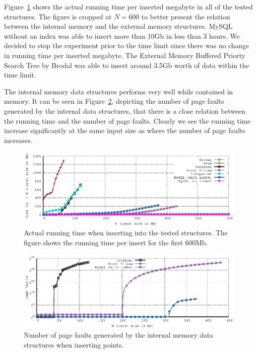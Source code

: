 \documentclass[twoside,11pt,openright]{report}
\begin{document}
Figure~\ref{fig:actual_insert_time} shows the actual running time per inserted megabyte in all of the tested structures. The figure is cropped at $N = 600$ to better present the relation between the internal memory and the external memory structures. MySQL without an index was able to insert more than 10Gb in less than 3 hours. We decided to stop the experiment prior to the time limit since there was no change in running time per inserted megabyte. The External Memory Buffered Priorty Search Tree by Brodal was able to insert around 3.5Gb worth of data within the time limit.

The internal memory data structures performs very well while contained in memory. It can be seen in Figure~\ref{fig:insert_page_faults}, depicting the number of page faults generated by the internal data structures, that there is a close relation between the running time and the number of page faults. Clearly we see the running time increase significantly at the same input size as where the number of page faults increases.

\begin{figure}[t]
\centering
\includegraphics[width=\textwidth]{../src/experiments/insert_experiment_results/combined_results/time_over_asymptotic}
\caption{Actual running time when inserting into the tested structures. The figure shows the running time per insert for the first 600Mb.}
\label{fig:actual_insert_time}
\end{figure}

\begin{figure}[b]
\centering
\includegraphics[width=\textwidth]{../src/experiments/insert_experiment_results/combined_results/pfs}
\caption{Number of page faults generated by the internal memory data structures when inserting points.}
\label{fig:insert_page_faults}
\end{figure} 
\end{document}
